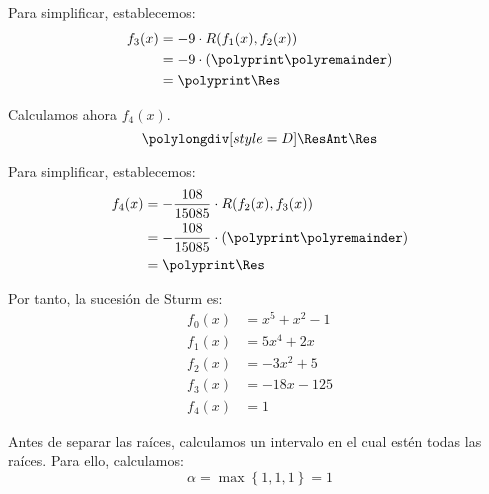 \begin{ejercicio}
\begin{enumerate}
        Para simplificar, establecemos:
        \begin{align*}
            f_3(x) &= -9\cdot R(f_1(x), f_2(x))\\
            &= -9\cdot \left(\polyprint\polyremainder\right)\\
            &= \polyprint\Res
        \end{align*}

        Calculamos ahora $f_4(x)$.
        \begin{equation*}
            \polylongdiv[style=D]\ResAnt\Res
        \end{equation*}
        \polydiv\div\ResAnt\Res
        \polymul\ResAnt{}
        \polymul\Res{}

        Para simplificar, establecemos:
        \begin{align*}
            f_4(x) &= -\dfrac{108}{15085}\cdot R(f_2(x), f_3(x))\\
            &= -\dfrac{108}{15085}\cdot \left(\polyprint\polyremainder\right)\\
            &= \polyprint\Res
        \end{align*}

        Por tanto, la sucesión de Sturm es:
        \begin{align*}
            f_0(x) &= x^5 + x^2 - 1\\
            f_1(x) &= 5x^4 + 2x\\
            f_2(x) &= -3x^2+5\\
            f_3(x) &= -18x-125\\
            f_4(x) &= 1
        \end{align*}

        Antes de separar las raíces, calculamos un intervalo en el cual estén todas las raíces. Para ello, calculamos:
        \begin{equation*}
            \alpha=\max\left\{1,1,1\right\}=1
        \end{equation*}


\end{enumerate}
\end{ejercicio}
